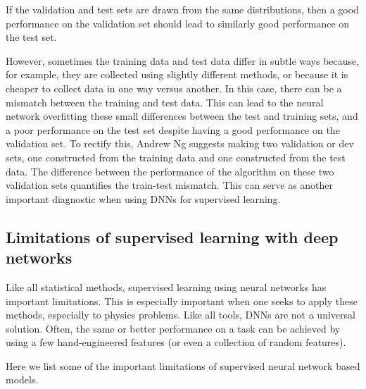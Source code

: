 \documentclass[%
oneside,                 %
final,                   %
10pt]{article}
\begin{document}
\noindent
If the validation and test sets are drawn from the same distributions,
then a good performance on the validation set should lead to similarly
good performance on the test set. 

However, sometimes
the training data and test data differ in subtle ways because, for
example, they are collected using slightly different methods, or
because it is cheaper to collect data in one way versus another. In
this case, there can be a mismatch between the training and test
data. This can lead to the neural network overfitting these small
differences between the test and training sets, and a poor performance
on the test set despite having a good performance on the validation
set. To rectify this, Andrew Ng suggests making two validation or dev
sets, one constructed from the training data and one constructed from
the test data. The difference between the performance of the algorithm
on these two validation sets quantifies the train-test mismatch. This
can serve as another important diagnostic when using DNNs for
supervised learning.


\subsection{Limitations of supervised learning with deep networks}

Like all statistical methods, supervised learning using neural
networks has important limitations. This is especially important when
one seeks to apply these methods, especially to physics problems. Like
all tools, DNNs are not a universal solution. Often, the same or
better performance on a task can be achieved by using a few
hand-engineered features (or even a collection of random
features). 

Here we list some of the important limitations of supervised neural network based models. 
\end{document}
